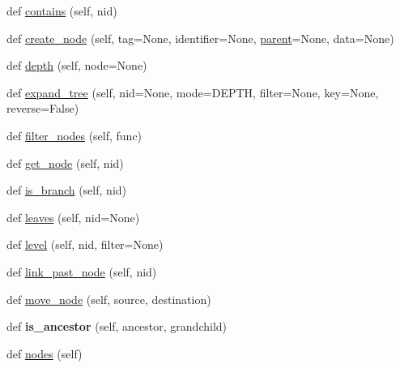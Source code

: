 \begin{DoxyCompactItemize}
\item 
def \mbox{\hyperlink{classapp_1_1main_1_1treelib_1_1tree_1_1Tree_aed85883a91c3bfe3e247115d041d42cc}{contains}} (self, nid)
\item 
def \mbox{\hyperlink{classapp_1_1main_1_1treelib_1_1tree_1_1Tree_a6bc326e192705fca6e6d71ea82fdcf57}{create\+\_\+node}} (self, tag=None, identifier=None, \mbox{\hyperlink{classapp_1_1main_1_1treelib_1_1tree_1_1Tree_a28ccb73f9aed492e66d879c664dc3b35}{parent}}=None, data=None)
\item 
def \mbox{\hyperlink{classapp_1_1main_1_1treelib_1_1tree_1_1Tree_a6ded8390652198c807e114ebe34692f6}{depth}} (self, node=None)
\item 
def \mbox{\hyperlink{classapp_1_1main_1_1treelib_1_1tree_1_1Tree_a5414ce6ec942fb619f8ff039113ffa16}{expand\+\_\+tree}} (self, nid=None, mode=D\+E\+P\+TH, filter=None, key=None, reverse=False)
\item 
def \mbox{\hyperlink{classapp_1_1main_1_1treelib_1_1tree_1_1Tree_a6c796bd0a0f6a97ddcaa4dc1808cd19e}{filter\+\_\+nodes}} (self, func)
\item 
def \mbox{\hyperlink{classapp_1_1main_1_1treelib_1_1tree_1_1Tree_a0eab04fe3e8c044a2c8c94a1d64e7fff}{get\+\_\+node}} (self, nid)
\item 
def \mbox{\hyperlink{classapp_1_1main_1_1treelib_1_1tree_1_1Tree_ad4d32e2665abec898618604bc706feaa}{is\+\_\+branch}} (self, nid)
\item 
def \mbox{\hyperlink{classapp_1_1main_1_1treelib_1_1tree_1_1Tree_a5ec4d13cd3bde4b97040c6e9bbf3253e}{leaves}} (self, nid=None)
\item 
def \mbox{\hyperlink{classapp_1_1main_1_1treelib_1_1tree_1_1Tree_a3d528173abf063f97e6dfbcf29a0564b}{level}} (self, nid, filter=None)
\item 
def \mbox{\hyperlink{classapp_1_1main_1_1treelib_1_1tree_1_1Tree_ae9fd733ebb27ca0f746951d1bb3ccd18}{link\+\_\+past\+\_\+node}} (self, nid)
\item 
def \mbox{\hyperlink{classapp_1_1main_1_1treelib_1_1tree_1_1Tree_a4663b9ae6dace6a5fb383e385ce46ac9}{move\+\_\+node}} (self, source, destination)
\item 
\mbox{\label{classapp_1_1main_1_1treelib_1_1tree_1_1Tree_a7110650b43b794293ce278d1ce8ad106}} 
def {\bfseries is\+\_\+ancestor} (self, ancestor, grandchild)
\item 
def \mbox{\hyperlink{classapp_1_1main_1_1treelib_1_1tree_1_1Tree_aa6848fc9aefc81193dcdda346b1d4e39}{nodes}} (self)

\end{DoxyCompactItemize}
